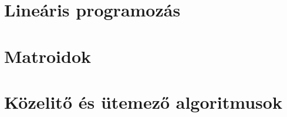 \documentclass[a4paper,12pt,twoside,openright]{book}
\begin{document}


\tableofcontents
\chapter{Lineáris programozás}







\chapter{Matroidok}







\chapter{Közelitő és ütemező algoritmusok}





\end{document}
